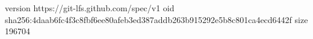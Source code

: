 version https://git-lfs.github.com/spec/v1
oid sha256:4daab6fc4f3c8fbf6ee80afeb3ed387addb263b915292e5b8c801ca4ecd6442f
size 196704
